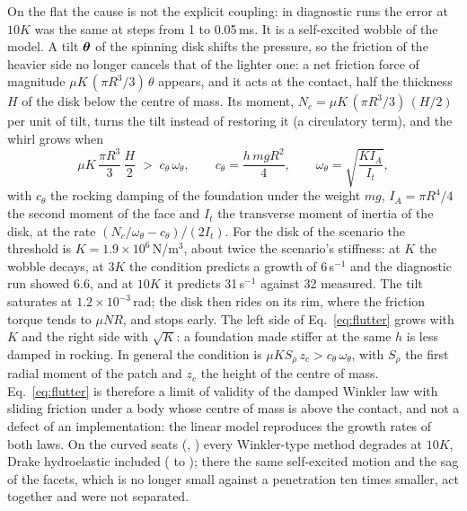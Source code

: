 On the flat  the cause is not the explicit coupling: in diagnostic runs the error at
$10K$ was the same at steps from 1 to 0.05\,ms.
It is a self-excited wobble of the model. A tilt $\boldsymbol{\theta}$ of the spinning disk shifts
the pressure, so the friction of the heavier side no longer cancels that of the lighter one: a
net friction force of magnitude $\mu K\,(\pi R^3/3)\,\theta$ appears, and it acts at the
contact, half the thickness $H$ of the disk below the centre of mass. Its moment,
$N_c = \mu K\,(\pi R^3/3)\,(H/2)$ per unit of tilt, turns the tilt instead of restoring it (a
circulatory term), and the whirl grows when
\begin{equation}
  \mu K\,\frac{\pi R^3}{3}\,\frac{H}{2} \;>\; c_\theta\,\omega_\theta ,
  \qquad c_\theta = \frac{h\,m g R^2}{4}, \qquad \omega_\theta = \sqrt{\frac{K I_A}{I_t}} ,
  \label{eq:flutter}
\end{equation}
with $c_\theta$ the rocking damping of the foundation under the weight $m g$,
$I_A = \pi R^4/4$ the second moment of the face and $I_t$ the transverse moment of inertia of
the disk, at the rate $(N_c/\omega_\theta - c_\theta)/(2 I_t)$. For the disk of the scenario
the threshold is $K = 1.9\times10^6$\,N/m$^3$, about twice the scenario's stiffness: at $K$ the
wobble decays, at $3K$ the condition predicts a growth of 6\,s$^{-1}$ and the diagnostic run
showed 6.6, and at $10K$ it predicts 31\,s$^{-1}$ against 32 measured. The tilt saturates at
$1.2\times10^{-3}$\,rad; the disk then rides on its rim, where the friction torque tends to
$\mu N R$, and stops early. The left side of Eq.~\eqref{eq:flutter} grows with $K$ and the
right side with $\sqrt{K}$: a foundation made stiffer at the same $h$ is less damped in
rocking. In general the condition is $\mu K S_\rho\,z_c > c_\theta\,\omega_\theta$, with
$S_\rho$ the first radial moment of the patch and $z_c$ the height of the centre of mass.
Eq.~\eqref{eq:flutter} is therefore a limit of validity of the damped Winkler law with sliding
friction under a body whose centre of mass is above the contact, and not a defect of an
implementation: the linear model reproduces the growth rates of both laws. On the curved seats
(, ) every Winkler-type method degrades at $10K$, Drake hydroelastic
included ( to ); there the same
self-excited motion and the sag of the facets, which is no longer small against a penetration
ten times smaller, act together and were not separated.


